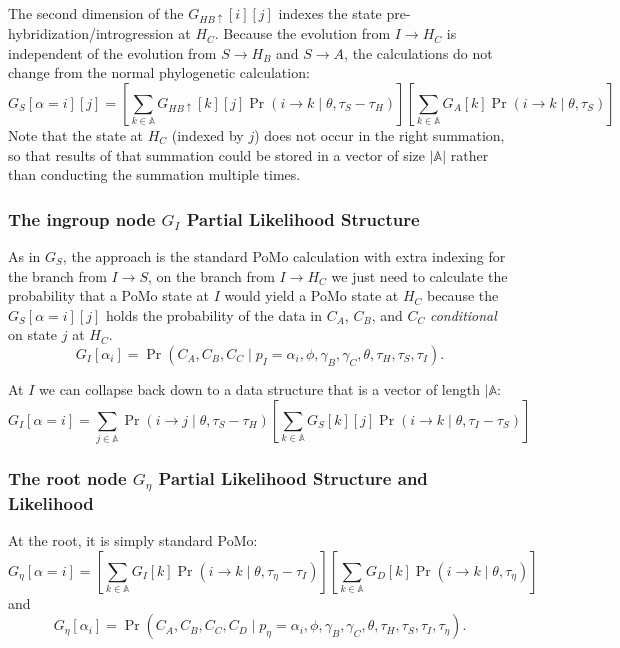 \documentclass{article}
\begin{document}
The second dimension of the $G_{HB\uparrow}[i][j]$ indexes the state pre-hybridization/introgression at $H_C$.
Because the evolution from $I\rightarrow H_C$ is independent of the evolution from $S\rightarrow H_B$ 
and $S\rightarrow A$, the calculations do not change from the normal phylogenetic calculation:
\begin{equation}
G_{S}[\alpha=i][j] = \left[\sum_{k\in \mathbb{A}} G_{HB\uparrow}[k][j]\Pr\left(i\rightarrow k \mid \theta, \tau_S - \tau_{H}\right)\right]
\left[\sum_{k\in \mathbb{A}} G_{A}[k]\Pr\left(i\rightarrow k \mid \theta, \tau_S \right)\right]
\end{equation}
Note that the state at $H_C$ (indexed by $j$) does not occur in the right summation, so that results of that summation could be stored in a vector of size $|\mathbb{A}|$ rather than conducting the summation multiple times.

\subsubsection{The ingroup node $G_I$ Partial Likelihood Structure}
As in $G_S$, the approach is the standard PoMo calculation with extra indexing for the branch from $I\rightarrow S$, on the branch from $I\rightarrow H_C$ we just need to calculate the probability that a PoMo state at $I$ would yield a PoMo state at $H_C$ because the $G_{S}[\alpha=i][j]$ holds the probability of the data in $C_A$, $C_B$, and $C_C$ {\em conditional} on state $j$ at $H_C$.
$$G_{I}[\alpha_i]= \Pr\left(C_A, C_B, C_C\mid p_I=\alpha_i, \phi, \gamma_B, \gamma_C, \theta, \tau_H, \tau_S, \tau_I\right).$$


At $I$ we can collapse back down to a data structure that is a vector of length $|\mathbb{A}$:
\begin{equation}
G_{I}[\alpha=i] = \sum_{j\in \mathbb{A}}\Pr\left(i\rightarrow j \mid \theta, \tau_S - \tau_H \right)
 \left[\sum_{k\in \mathbb{A}} G_{S}[k][j]\Pr\left(i\rightarrow k \mid \theta, \tau_I - \tau_{S}\right)\right]
\end{equation}

\subsubsection{The root node $G_\eta$ Partial Likelihood Structure and Likelihood}
At the root, it is simply standard PoMo:
\begin{equation}
G_{\eta}[\alpha=i] = \left[\sum_{k\in \mathbb{A}} G_{I}[k]\Pr\left(i\rightarrow k \mid \theta, \tau_{\eta} - \tau_{I}\right)\right]\left[\sum_{k\in \mathbb{A}} G_{D}[k]\Pr\left(i\rightarrow k \mid \theta, \tau_{\eta} \right)\right]
\end{equation}
and 
$$G_{\eta}[\alpha_i]= \Pr\left(C_A, C_B, C_C, C_D\mid p_{\eta}=\alpha_i, \phi, \gamma_B, \gamma_C, \theta, \tau_H, \tau_S, \tau_I, \tau_{\eta}\right).$$
\end{document}

